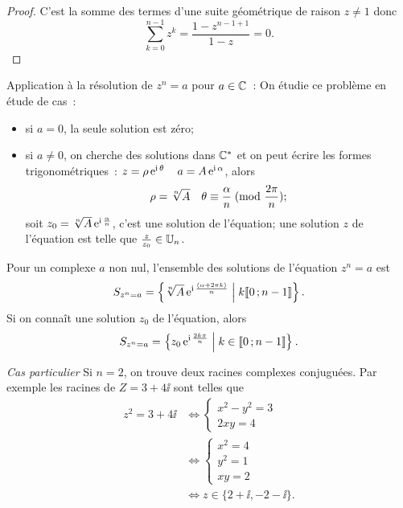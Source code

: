 \begin{proof}
    C'est la somme des termes d'une suite géométrique de raison \(z \neq 1\) donc
    \begin{equation}
        \sum_{k=0}^{n-1} z^k = \frac{1-z^{n-1+1}}{1-z} = 0.
    \end{equation}
\end{proof}
Application à la résolution de \(z^n=a\) pour \(a \in \mathbb{C}\)~: On étudie ce 
problème en étude de cas~:
\begin{itemize}
    \item si \(a=0\), la seule solution est zéro;
    \item si \(a \neq 0\), on cherche des solutions dans \(\mathbb{C}^*\) et on peut 
        écrire les formes trigonométriques~: \(z=\rho \operatorname{e}^{\operatorname{i} \theta} \quad a = 
        A \operatorname{e}^{\operatorname{i} \alpha}\), alors
        \begin{equation}
            \rho = \sqrt[n]{A} \quad 
            \theta \equiv \frac{\alpha}{n}\!\pmod {\frac{2\pi}{n}};
        \end{equation}
        soit \(z_0=\sqrt[n]{A}  \operatorname{e}^{\operatorname{i} \frac{\alpha}{n}}\), c'est une solution 
        de l'équation; une solution \(z\) de l'équation est telle que 
        \(\frac{z}{z_0} \in \mathbb{U}_n\).
\end{itemize}
\begin{prop}
    Pour un complexe \(a\) non nul, l'ensemble des solutions de l'équation 
    \(z^n=a\) est
    \begin{equation}
        S_{z^n=a}=\left\{\sqrt[n]{A} \operatorname{e}^{\operatorname{i} \frac{(\alpha + 2\pi k)}{n}}\mathrel{}\middle|\mathrel{}k 
        \mathopen{\llbracket}0\mathclose{}\mathpunct{};n-1\mathclose{\rrbracket}\right\}.
    \end{equation}
    Si on connaît une solution \(z_0\) de l'équation, alors
    \begin{equation}
        S_{z^n=a}=\left\{z_0 \operatorname{e}^{\operatorname{i} \frac{2 k \pi}{n}}\mathrel{}\middle|\mathrel{}k \in 
        \mathopen{\llbracket}0\mathclose{}\mathpunct{};n-1\mathclose{\rrbracket}\right\}.
    \end{equation}
\end{prop}
\emph{Cas particulier}
Si \(n=2\), on trouve deux racines complexes conjuguées. Par exemple les racines 
de \(Z=3+4\ii\) sont telles que
\begin{align}
    z^2=3+4\ii & \iff  \begin{cases} x^2-y^2=3 \\ 2xy=4 \end{cases} \\
               & \iff \begin{cases} x^2=4 \\ y^2=1 \\ xy=2 \end{cases} \\
               & \iff z \in \{2+\ii, -2-\ii\}.
\end{align}
